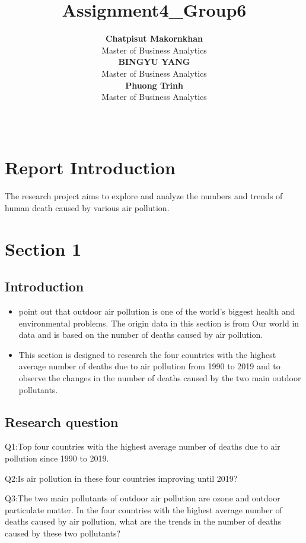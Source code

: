 \documentclass[11pt,a4paper,]{article}
\title{Assignment4\_Group6}
\author{\sf\Large\textbf{ Chatpisut Makornkhan}\\ {\sf\large Master of Business Analytics\\[0.5cm]} \sf\Large\textbf{ BINGYU YANG}\\ {\sf\large Master of Business Analytics\\[0.5cm]} \sf\Large\textbf{ Phuong Trinh}\\ {\sf\large Master of Business Analytics\\[0.5cm]}}
\date{\sf\Date~\Month~\Year}
\makeatletter
\def\titlepage{\front{\expandafter{\@title}}{\@author}{\@organization}}
\makeatother
\begin{document}
\titlepage

{
\setcounter{tocdepth}{2}
\tableofcontents
}
\hypertarget{report-introduction}{%
\section{Report Introduction}\label{report-introduction}}

The research project aims to explore and analyze the numbers and trends of human death caused by various air pollution.

\hypertarget{section-1}{%
\section{Section 1}\label{section-1}}

\hypertarget{introduction}{%
\subsection{Introduction}\label{introduction}}

\begin{itemize}
\item
  \textcite{owidoutdoorairpollution} point out that outdoor air pollution is one of the world's biggest health and environmental problems. The origin data in this section is from Our world in data and is based on the number of deaths caused by air pollution.
\item
  This section is designed to research the four countries with the highest average number of deaths due to air pollution from 1990 to 2019 and to observe the changes in the number of deaths caused by the two main outdoor pollutants.
\end{itemize}

\hypertarget{research-question}{%
\subsection{Research question}\label{research-question}}

Q1:Top four countries with the highest average number of deaths due to air pollution since 1990 to 2019.

Q2:Is air pollution in these four countries improving until 2019?

Q3:The two main pollutants of outdoor air pollution are ozone and outdoor particulate matter. In the four countries with the highest average number of deaths caused by air pollution, what are the trends in the number of deaths caused by these two pollutants?
\end{document}
